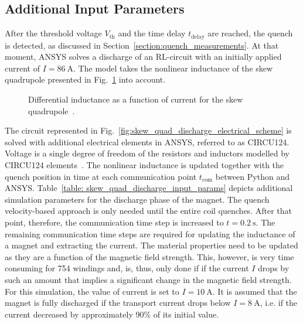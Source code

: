 
\subsection{Additional Input Parameters}

After the threshold voltage $V_\text{th}$ and the time delay $t_\text{delay}$ are reached, the quench is detected, as discussed in Section~\ref{section:quench_measurements}. At that moment, ANSYS solves a discharge of an RL-circuit with an initially applied current of $I=86~\text{A}$. The model takes the nonlinear inductance of the skew quadrupole presented in Fig.~\ref{fig:differential_inductance} into account.

\begin{figure}[H]
    \centering
    \caption{Differential inductance as a function of current for the skew quadrupole~\cite{marco_prioli_mails}.}
    \label{fig:differential_inductance}
\end{figure}

The circuit represented in Fig.~\ref{fig:skew_quad_discharge_electrical_scheme} is solved with additional electrical elements in ANSYS, referred to as CIRCU124. Voltage is a single degree of freedom of the resistors and inductors modelled by CIRCU124 elements~\cite{ansys_element_manual}. The nonlinear inductance is updated together with the quench position in time at each communication point $t_\text{com}$ between Python and ANSYS. Table~\ref{table: skew_quad_discharge_input_params} depicts additional simulation parameters for the discharge phase of the magnet. The quench velocity-based approach is only needed until the entire coil quenches. After that point, therefore, the communication time step is increased to $t=0.2~\text{s}$. The remaining communication time steps are required for updating the inductance of a magnet and extracting the current. The material properties need to be updated as they are a function of the magnetic field strength. This, however, is very time consuming for 754 windings and, is, thus, only done if if the current $I$ drops by such an amount that implies a significant change in the magnetic field strength. For this simulation, the value of current is set to $I=10~\text{A}$. It is assumed that the magnet is fully discharged if the transport current drops below $I=8~\text{A}$, i.e. if the current decreased by approximately 90\% of its initial value.

